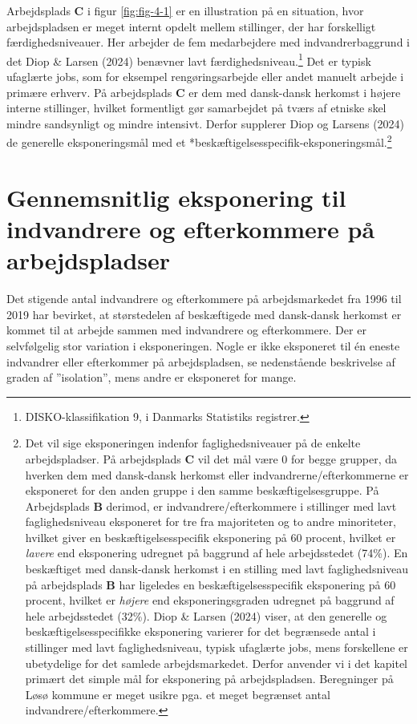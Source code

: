 \documentclass[
]{book}
\begin{document}
Arbejdsplads \textbf{C} i figur \ref{fig:fig-4-1} er en illustration på en situation, hvor arbejdspladsen er meget internt opdelt mellem stillinger, der har forskelligt færdighedsniveauer. Her arbejder de fem medarbejdere med indvandrerbaggrund i det Diop \& Larsen (2024) benævner lavt færdighedsniveau.\footnote{DISKO-klassifikation 9, i Danmarks Statistiks registrer.} Det er typisk ufaglærte jobs, som for eksempel rengøringsarbejde eller andet manuelt arbejde i primære erhverv. På arbejdsplads \textbf{C} er dem med dansk-dansk herkomst i højere interne stillinger, hvilket formentligt gør samarbejdet på tværs af etniske skel mindre sandsynligt og mindre intensivt. Derfor supplerer Diop og Larsens (2024) de generelle eksponeringsmål med et *beskæftigelsesspecifik-eksponeringsmål.\footnote{Det vil sige eksponeringen indenfor faglighedsniveauer på de enkelte arbejdspladser. På arbejdsplads \textbf{C} vil det mål være 0 for begge grupper, da hverken dem med dansk-dansk herkomst eller indvandrerne/efterkommerne er eksponeret for den anden gruppe i den samme beskæftigelsesgruppe. På Arbejdsplads \textbf{B} derimod, er indvandrere/efterkommere i stillinger med lavt faglighedsniveau eksponeret for tre fra majoriteten og to andre minoriteter, hvilket giver en beskæftigelsesspecifik eksponering på 60 procent, hvilket er \emph{lavere} end eksponering udregnet på baggrund af hele arbejdsstedet (74\%). En beskæftiget med dansk-dansk herkomst i en stilling med lavt faglighedsniveau på arbejdsplads \textbf{B} har ligeledes en beskæftigelsesspecifik eksponering på 60 procent, hvilket er \emph{højere} end eksponeringsgraden udregnet på baggrund af hele arbejdsstedet (32\%). Diop \& Larsen (2024) viser, at den generelle og beskæftigelsesspecifikke eksponering varierer for det begrænsede antal i stillinger med lavt faglighedsniveau, typisk ufaglærte jobs, mens forskellene er ubetydelige for det samlede arbejdsmarkedet. Derfor anvender vi i det kapitel primært det simple mål for eksponering på arbejdspladsen. Beregninger på Løsø kommune er meget usikre pga. et meget begrænset antal indvandrere/efterkommere.}

\section{Gennemsnitlig eksponering til indvandrere og efterkommere på arbejdspladser}\label{gennemsnitlig-eksponering-til-indvandrere-og-efterkommere-puxe5-arbejdspladser}

Det stigende antal indvandrere og efterkommere på arbejdsmarkedet fra 1996 til 2019 har bevirket, at størstedelen af beskæftigede med dansk-dansk herkomst er kommet til at arbejde sammen med indvandrere og efterkommere. Der er selvfølgelig stor variation i eksponeringen. Nogle er ikke eksponeret til én eneste indvandrer eller efterkommer på arbejdspladsen, se nedenstående beskrivelse af graden af ''isolation'', mens andre er eksponeret for mange.
\end{document}
